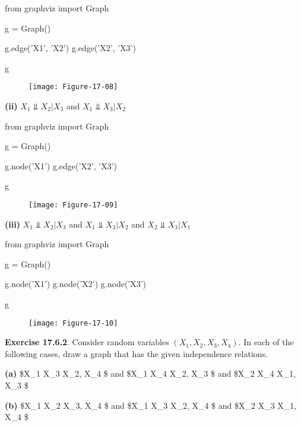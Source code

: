 \begin{python}
from graphviz import Graph

g = Graph()

g.edge('X1', 'X2')
g.edge('X2', 'X3')

g
\end{python}

\begin{figure}[H]
\texttt{[image: Figure-17-08]}
\end{figure}

\textbf{(ii)} \(X_1 \text{ ⫫ } X_2 | X_3\) and
\(X_1 \text{ ⫫ } X_3 | X_2\)

\begin{python}
from graphviz import Graph

g = Graph()

g.node('X1')
g.edge('X2', 'X3')

g
\end{python}
 
\begin{figure}[H]
\texttt{[image: Figure-17-09]}
\end{figure}

\textbf{(iii)} \(X_1 \text{ ⫫ } X_2 | X_3\) and
\(X_1 \text{ ⫫ } X_3 | X_2\) and \(X_2 \text{ ⫫ } X_3 | X_1\)

\begin{python}
from graphviz import Graph

g = Graph()

g.node('X1')
g.node('X2')
g.node('X3')

g
\end{python}
 
\begin{figure}[H]
\texttt{[image: Figure-17-10]}
\end{figure}

\textbf{Exercise 17.6.2}. Consider random variables
\((X_1, X_2, X_3, X_4)\). In each of the following cases, draw a graph
that has the given independence relations.

\textbf{(a)} \$X\_1  X\_3 \textbar{} X\_2, X\_4 \$ and \$X\_1
 X\_4 \textbar{} X\_2, X\_3 \$ and \$X\_2  X\_4
\textbar{} X\_1, X\_3 \$

\textbf{(b)} \$X\_1  X\_2 \textbar{} X\_3, X\_4 \$ and \$X\_1
 X\_3 \textbar{} X\_2, X\_4 \$ and \$X\_2  X\_3
\textbar{} X\_1, X\_4 \$

